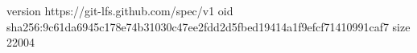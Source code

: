 version https://git-lfs.github.com/spec/v1
oid sha256:9c61da6945c178e74b31030c47ee2fdd2d5fbed19414a1f9efcf71410991caf7
size 22004
